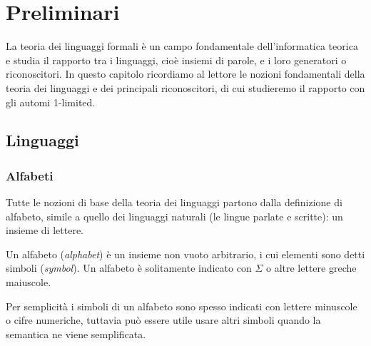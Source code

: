 \chapter{Preliminari}
La teoria dei linguaggi formali è un campo fondamentale dell'informatica teorica e studia il rapporto tra i linguaggi, cioè insiemi di parole, e i loro generatori o riconoscitori. In questo capitolo ricordiamo al lettore le nozioni fondamentali della teoria dei linguaggi e dei principali riconoscitori, di cui studieremo il rapporto con gli automi 1-limited.



\section{Linguaggi}


\subsection*{Alfabeti}
Tutte le nozioni di base della teoria dei linguaggi partono dalla definizione di alfabeto, simile a quello dei linguaggi naturali (le lingue parlate e scritte): un insieme di lettere.
\begin{defin}[alfabeto]
	Un alfabeto (\emph{alphabet}) è un insieme non vuoto arbitrario, i cui elementi sono detti simboli (\emph{symbol}). Un alfabeto è solitamente indicato con $\Sigma$ o altre lettere greche maiuscole.
\end{defin}
Per semplicità i simboli di un alfabeto sono spesso indicati con lettere minuscole o cifre numeriche, tuttavia può essere utile usare altri simboli quando la semantica ne viene semplificata.


